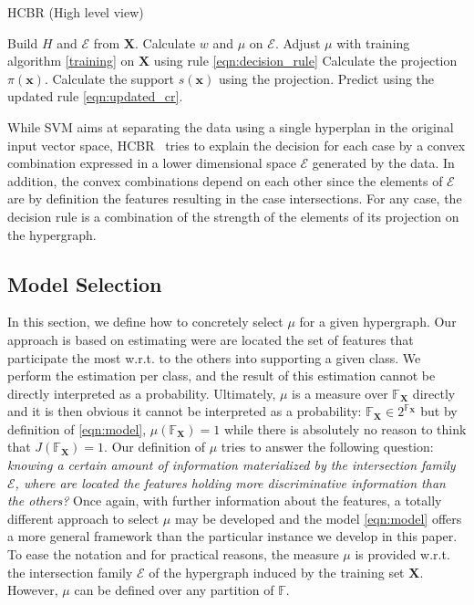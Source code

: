 \documentclass[preprint,12pt]{elsarticle}
\def\HCBR{{\sc HCBR}}
\theoremstyle{definition}
\begin{document}
\algrenewcommand\algorithmicindent{1.0em}%
\begin{algorithm}
  \caption{HCBR (High level view)}\label{algo:HCBR}
  \begin{algorithmic}[1]
    \State Build $H$ and $\mathcal E$ from $\mathbf X$.
    \State Calculate $w$ and $\mu$ on $\mathcal E$.
    \State Adjust $\mu$ with training algorithm \ref{training} on $\mathbf X$ using rule \eqref{eqn:decision_rule}
        \State Calculate the projection $\pi(\mathbf x)$.
        \State Calculate the support $s(\mathbf x)$ using the projection.
        \State Predict using the updated rule \eqref{eqn:updated_cr}.
    \EndFor
  \end{algorithmic}
\end{algorithm}


While SVM aims at separating the data using a single hyperplan in the original input vector space, \HCBR~ tries to explain the decision for each case by a convex combination expressed in a lower dimensional space $\mathcal E$ generated by the data. In addition, the convex combinations depend on each other since the elements of $\mathcal E$ are by definition the features resulting in the case intersections. For any case, the decision rule is a combination of the strength of the elements of its projection on the hypergraph.

\subsection{Model Selection}
\label{sec:model_selection}

In this section, we define how to concretely select $\mu$ for a given hypergraph. Our approach is based on estimating were are located the set of features that participate the most w.r.t. to the others into supporting a given class. We perform the estimation per class, and the result of this estimation cannot be directly interpreted as a probability. Ultimately, $\mu$ is a measure over $\mathbb{F}_{\mathbf X}$ directly and it is then obvious it cannot be interpreted as a probability: $\mathbb{F}_{\mathbf X} \in 2^{\mathbb{F}_{\mathbf X}}$ but by definition of \eqref{eqn:model}, $\mu(\mathbb{F}_{\mathbf X}) = 1$ while there is absolutely no reason to think that $J(\mathbb{F}_{\mathbf X}) = 1$. Our definition of $\mu$ tries to answer the following question: {\it knowing a certain amount of information materialized by the intersection family $\mathcal E$, where are located the features holding more discriminative information than the others?} Once again, with further information about the features, a totally different approach to select $\mu$ may be developed and the model \eqref{eqn:model} offers a more general framework than the particular instance we develop in this paper.
 To ease the notation and for practical reasons, the measure $\mu$ is provided w.r.t. the intersection family $\mathcal E$ of the hypergraph induced by the training set $\mathbf X$. However, $\mu$ can be defined over any partition of $\mathbb F$.
\end{document}
